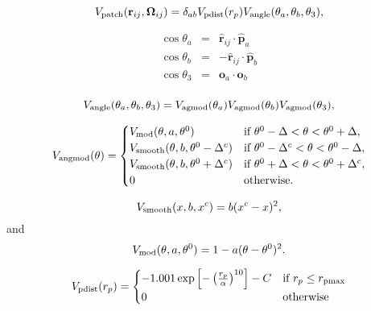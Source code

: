 \begin{equation}
V_{\rm patch}(\mathbf{r}_{ij},\mathbf{\Omega}_{ij}) = \delta_{ab} V_{\rm pdist}(r_p) V_{\rm angle}(\theta_a, \theta_b, \theta_3), 
\end{equation}

\begin{eqnarray*}
\cos \theta_a &=&  \mathbf{\hat{r}}_{ij} \cdot \mathbf{\hat{p}}_a \\
\cos \theta_b &=&  \mathbf{-\hat{r}}_{ij} \cdot \mathbf{\hat{p}}_b \\
\cos \theta_3 &=&  \mathbf{o}_{a} \cdot \mathbf{o}_b  \\
\end{eqnarray*}

\begin{equation}
    V_{\rm angle}(\theta_a, \theta_b, \theta_3) = V_{\rm agmod}(\theta_a) V_{\rm agmod}(\theta_b)
    V_{\rm agmod}(\theta_3) ,
\end{equation}

\begin{equation}
V_{\rm angmod}(\theta) = \begin{cases}
	V_{\rm mod}(\theta, a, \theta^0)  & \text{if $ \theta^0 - \Delta < \theta < \theta^0 + \Delta  $},\\
	V_{\rm smooth} (\theta, b, \theta^0 - \Delta^c) & \text{if $\theta^0 - \Delta^c < \theta < \theta^0-\Delta $},\\
	V_{\rm smooth} (\theta, b, \theta^0 + \Delta^c) & \text{if $\theta^0 + \Delta < \theta < \theta^0+\Delta^c$},\\
	0 & \text{otherwise}.
	\end{cases} 
\end{equation}

\begin{equation}
\label{eq:smooth}
V_{\rm smooth} (x, b, x^c) = b(x^c - x)^2, 
\end{equation}
and
\begin{equation}
V_{\rm mod} (\theta, a, \theta^0) = 1 - a (\theta-\theta^0)^2.
\end{equation}

\begin{equation}
    \label{eq_patch}
    V_{\rm pdist}(r_p) =  \begin{cases} 
                          -1.001  \exp{\left[- \left( \frac{r_p}{\alpha} \right)^{10}\right]} - C & \text{if $r_p \leq r_{\rm pmax}  $} \\
                          0 & \text{otherwise}
                        \end{cases}
\end{equation}


